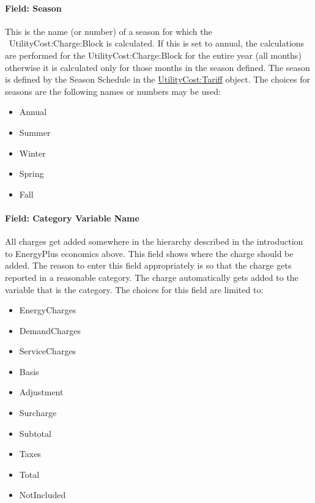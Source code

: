 \paragraph{Field: Season}\label{field-season}

This is the name (or number) of a season for which the ~UtilityCost:Charge:Block is calculated. If this is set to annual, the calculations are performed for the UtilityCost:Charge:Block for the entire year (all months) otherwise it is calculated only for those months in the season defined. The season is defined by the Season Schedule in the \hyperref[utilitycosttariff]{UtilityCost:Tariff} object. The choices for seasons are the following names or numbers may be used:

\begin{itemize}
\item
  Annual
\item
  Summer
\item
  Winter
\item
  Spring
\item
  Fall
\end{itemize}

\paragraph{Field: Category Variable Name}\label{field-category-variable-name}

All charges get added somewhere in the hierarchy described in the introduction to EnergyPlus economics above. This field shows where the charge should be added. The reason to enter this field appropriately is so that the charge gets reported in a reasonable category. The charge automatically gets added to the variable that is the category. The choices for this field are limited to:

\begin{itemize}
\item
  EnergyCharges
\item
  DemandCharges
\item
  ServiceCharges
\item
  Basis
\item
  Adjustment
\item
  Surcharge
\item
  Subtotal
\item
  Taxes
\item
  Total
\item
  NotIncluded
\end{itemize}

